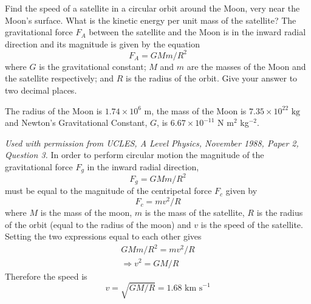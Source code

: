 \begin{problem}
{Find the speed of a satellite in a circular orbit around the Moon, very near the Moon's surface. What is the kinetic energy per unit mass of the satellite?
The gravitational force $F_A$ between the satellite and the Moon is in the inward radial direction and its magnitude is given by the equation 
\begin{equation*}
F_A=GMm/R^2
\end{equation*}
where $G$ is the gravitational constant; $M$ and $m$ are the masses of the Moon and the satellite respectively; and $R$ is the radius of the orbit. Give your answer to two decimal places.

 The radius of the Moon is $1.74\times 10^6\textrm{ m}$, the mass of the Moon is $7.35\times 10^{22}\textrm{ kg}$ and Newton's Gravitational Constant, $G$, is $6.67 \times 10^{-11}$ N m$^{2}$ kg$^{-2}$.} 
{\textit{Used with permission from UCLES, A Level Physics, November 1988, Paper 2, Question 3.}}
{In order to perform circular motion the magnitude of the gravitational force $F_g$ in the inward radial direction, 
\begin{equation*} F_g=GMm/R^2 \end{equation*}
must be equal to the magnitude of the centripetal force $F_c$ given by 
\begin{equation*} F_c=mv^2/R \end{equation*}
where $M$ is the mass of the moon, $m$ is the mass of the satellite, $R$ is the radius of the orbit (equal to the radius of the moon) and $v$ is the speed of the satellite. Setting the two expressions equal to each other gives
\begin{align*} GMm/R^2=mv^2/R \\ \Rightarrow v^2=GM/R \end{align*}
Therefore the speed is 
\begin{equation*} v=\sqrt{GM/R}=1.68\textrm{ km s}^{-1} \end{equation*} 
}
\end{problem}